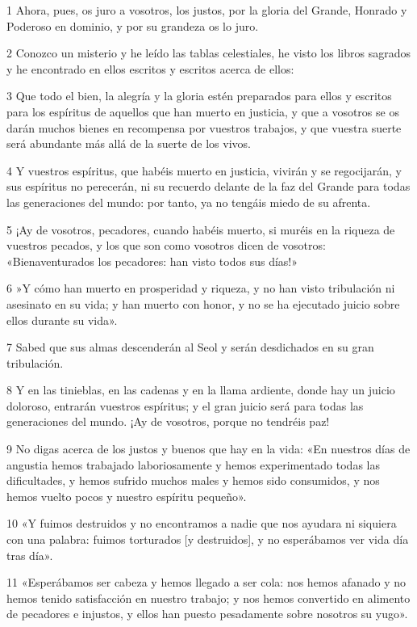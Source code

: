 \par 1 Ahora, pues, os juro a vosotros, los justos, por la gloria del Grande, Honrado y Poderoso en dominio, y por su grandeza os lo juro.
\par 2 Conozco un misterio y he leído las tablas celestiales, he visto los libros sagrados y he encontrado en ellos escritos y escritos acerca de ellos:
\par 3 Que todo el bien, la alegría y la gloria estén preparados para ellos y escritos para los espíritus de aquellos que han muerto en justicia, y que a vosotros se os darán muchos bienes en recompensa por vuestros trabajos, y que vuestra suerte será abundante más allá de la suerte de los vivos.
\par 4 Y vuestros espíritus, que habéis muerto en justicia, vivirán y se regocijarán, y sus espíritus no perecerán, ni su recuerdo delante de la faz del Grande para todas las generaciones del mundo: por tanto, ya no tengáis miedo de su afrenta.
\par 5 ¡Ay de vosotros, pecadores, cuando habéis muerto, si muréis en la riqueza de vuestros pecados, y los que son como vosotros dicen de vosotros: «Bienaventurados los pecadores: han visto todos sus días!»
\par 6 »Y cómo han muerto en prosperidad y riqueza, y no han visto tribulación ni asesinato en su vida; y han muerto con honor, y no se ha ejecutado juicio sobre ellos durante su vida».
\par 7 Sabed que sus almas descenderán al Seol y serán desdichados en su gran tribulación.
\par 8 Y en las tinieblas, en las cadenas y en la llama ardiente, donde hay un juicio doloroso, entrarán vuestros espíritus; y el gran juicio será para todas las generaciones del mundo. ¡Ay de vosotros, porque no tendréis paz!
\par 9 No digas acerca de los justos y buenos que hay en la vida: «En nuestros días de angustia hemos trabajado laboriosamente y hemos experimentado todas las dificultades, y hemos sufrido muchos males y hemos sido consumidos, y nos hemos vuelto pocos y nuestro espíritu pequeño».
\par 10 «Y fuimos destruidos y no encontramos a nadie que nos ayudara ni siquiera con una palabra: fuimos torturados [y destruidos], y no esperábamos ver vida día tras día».
\par 11 «Esperábamos ser cabeza y hemos llegado a ser cola: nos hemos afanado y no hemos tenido satisfacción en nuestro trabajo; y nos hemos convertido en alimento de pecadores e injustos, y ellos han puesto pesadamente sobre nosotros su yugo».
